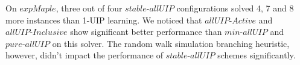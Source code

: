 \documentclass[runningheads]{llncs}
\newcommand{\allUip}{\textit{stable-allUIP}}
\newcommand{\allUipPure}{\textit{pure-allUIP}\xspace}
\newcommand{\allUipMin}{\textit{min-allUIP}\xspace}
\newcommand{\allUipAct}{\textit{allUIP-Active}}
\newcommand{\allUipIn}{\textit{allUIP-Inclusive}}
\newcommand{\expSATShort}{\textit{expMaple} }
\begin{document}

On $\expSATShort$, three out of four $\allUip$ configurations solved
4, 7 and 8 more instances than 1-UIP learning. We noticed that
$\allUipAct$ and $\allUipIn$ show significant better performance than
$\allUipMin$ and $\allUipPure$ on this solver. The random walk
simulation branching heuristic, however, didn't impact the performance
of $\allUip$ schemes significantly.

{}

\end{document}
